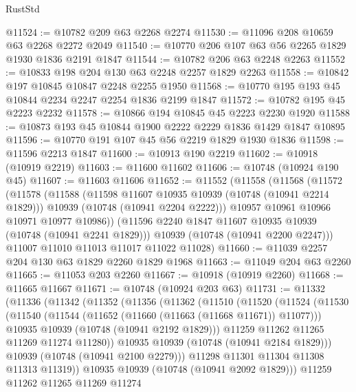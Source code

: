 \begin{lexlean}{RustStd}
\begin{coremodule}
@11524 := @10782 @209 @63 @2268 @2274
@11530 := @11096 @208 @10659 @63 @2268 @2272 @2049
@11540 := @10770 @206 @107 @63 @56 @2265 @1829 @1930 @1836 @2191 @1847
@11544 := @10782 @206 @63 @2248 @2263
@11552 := @10833 @198 @204 @130 @63 @2248 @2257 @1829 @2263
@11558 := @10842 @197 @10845 @10847 @2248 @2255 @1950
@11568 := @10770 @195 @193 @45 @10844 @2234 @2247 @2254 @1836 @2199 @1847
@11572 := @10782 @195 @45 @2223 @2232
@11578 := @10866 @194 @10845 @45 @2223 @2230 @1920
@11588 := @10873 @193 @45 @10844 @1900 @2222 @2229 @1836 @1429 @1847 @10895
@11596 := @10770 @191 @107 @45 @56 @2219 @1829 @1930 @1836
@11598 := @11596 @2213 @1847
@11600 := @10913 @190 @2219
@11602 := @10918 (@10919 @2219)
@11603 := @11600 @11602
@11606 := @10748 (@10924 @190 @45)
@11607 := @11603 @11606
@11652 := @11552
    (@11558
      (@11568
        (@11572
          (@11578
            (@11588
              (@11598 @11607 @10935 @10939 (@10748 (@10941 @2214 @1829)))
              @10939
              (@10748 (@10941 @2204 @2222)))
            @10957
            @10961
            @10966
            @10971
            @10977
            @10986))
        (@11596 @2240 @1847 @11607 @10935 @10939 (@10748 (@10941 @2241 @1829)))
        @10939
        (@10748 (@10941 @2200 @2247)))
      @11007
      @11010
      @11013
      @11017
      @11022
      @11028)
@11660 := @11039 @2257 @204 @130 @63 @1829 @2260 @1829 @1968
@11663 := @11049 @204 @63 @2260
@11665 := @11053 @203 @2260
@11667 := @10918 (@10919 @2260)
@11668 := @11665 @11667
@11671 := @10748 (@10924 @203 @63)
@11731 := @11332
    (@11336
      (@11342
        (@11352
          (@11356
            (@11362
              (@11510
                (@11520
                  (@11524
                    (@11530
                      (@11540
                        (@11544 (@11652 (@11660 (@11663 (@11668 @11671)) @11077)))
                        @10935
                        @10939
                        (@10748 (@10941 @2192 @1829)))
                      @11259
                      @11262
                      @11265
                      @11269
                      @11274
                      @11280))
                  @10935
                  @10939
                  (@10748 (@10941 @2184 @1829)))
                @10939
                (@10748 (@10941 @2100 @2279)))
              @11298
              @11301
              @11304
              @11308
              @11313
              @11319))
          @10935
          @10939
          (@10748 (@10941 @2092 @1829)))
        @11259
        @11262
        @11265
        @11269
        @11274

\end{coremodule}
\end{lexlean}
